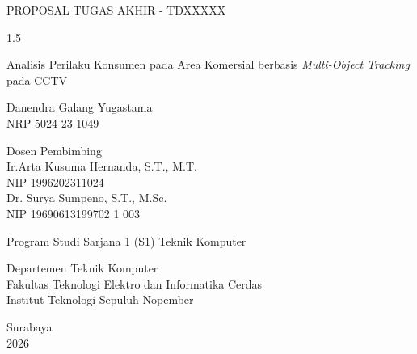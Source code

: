 \begin{large}
  PROPOSAL TUGAS AKHIR - TDXXXXX
\end{large}

\vspace{\fill}

\begin{spacing}{1.5}
  \begin{Large}
    Analisis Perilaku Konsumen pada Area Komersial berbasis \textit{Multi-Object Tracking} pada CCTV
  \end{Large}
\end{spacing}

\vspace{\fill}

\begin{large}
  Danendra Galang Yugastama \\
  \textmd{NRP 5024 23 1049}
\end{large}

\vspace{\fill}

\begin{large}
  \textmd{Dosen Pembimbing} \\
   Ir.Arta Kusuma Hernanda, S.T., M.T. \\
  \textmd{NIP 1996202311024} \\
  Dr. Surya Sumpeno, S.T., M.Sc. \\
  \textmd{NIP 19690613199702 1 003}
\end{large}

\vspace{\fill}

Program Studi Sarjana 1 (S1) Teknik Komputer \\

\mdseries

Departemen Teknik Komputer \\
Fakultas Teknologi Elektro dan Informatika Cerdas \\
Institut Teknologi Sepuluh Nopember

Surabaya \\
2026
